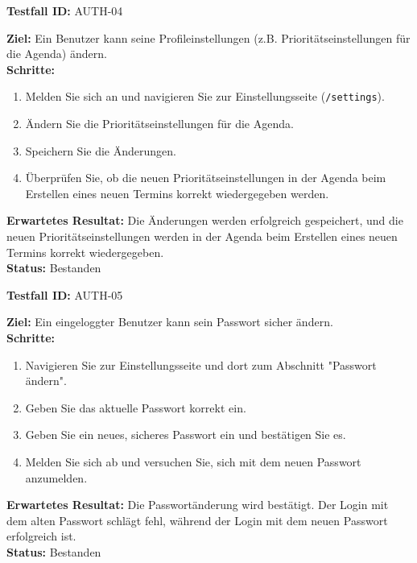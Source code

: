 \documentclass[11pt, a4paper]{article}
\newenvironment{testcase}[1]{%
    \par\vspace{1em}\noindent\begin{minipage}{\linewidth}
    \textbf{Testfall ID:} #1 \\
    \vspace{0.2em}
}{\end{minipage}\par\vspace{1em}}
\begin{document}
\begin{testcase}{AUTH-04}
    \textbf{Ziel:} Ein Benutzer kann seine Profileinstellungen (z.B. Prioritätseinstellungen für die Agenda) ändern.\\
    \textbf{Schritte:}
    \begin{enumerate}[label=\arabic*.]
        \item Melden Sie sich an und navigieren Sie zur Einstellungsseite (\texttt{/settings}).
        \item Ändern Sie die Prioritätseinstellungen für die Agenda.
        \item Speichern Sie die Änderungen.
        \item Überprüfen Sie, ob die neuen Prioritätseinstellungen in der Agenda beim Erstellen eines neuen Termins korrekt wiedergegeben werden.
    \end{enumerate}
    \textbf{Erwartetes Resultat:} Die Änderungen werden erfolgreich gespeichert, und die neuen Prioritätseinstellungen werden in der Agenda beim Erstellen eines neuen Termins korrekt wiedergegeben.\\
    \vspace{0.5em}\textbf{Status:} \textcolor{passcolor}{Bestanden}
\end{testcase}

\begin{testcase}{AUTH-05}
    \textbf{Ziel:} Ein eingeloggter Benutzer kann sein Passwort sicher ändern.\\
    \textbf{Schritte:}
    \begin{enumerate}[label=\arabic*.]
        \item Navigieren Sie zur Einstellungsseite und dort zum Abschnitt "Passwort ändern".
        \item Geben Sie das aktuelle Passwort korrekt ein.
        \item Geben Sie ein neues, sicheres Passwort ein und bestätigen Sie es.
        \item Melden Sie sich ab und versuchen Sie, sich mit dem neuen Passwort anzumelden.
    \end{enumerate}
    \textbf{Erwartetes Resultat:} Die Passwortänderung wird bestätigt. Der Login mit dem alten Passwort schlägt fehl, während der Login mit dem neuen Passwort erfolgreich ist.\\
    \vspace{0.5em}\textbf{Status:} \textcolor{passcolor}{Bestanden}
\end{testcase}
\end{document}
